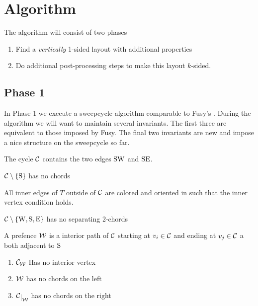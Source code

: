 
\section{Algorithm}
  The algorithm will consist of two phases

  \begin{enumerate}
    \item Find a \emph{vertically} 1-sided layout with additional properties
    \item Do additional post-processing steps to make this layout $k$-sided.
  \end{enumerate}

\subsection{Phase 1}
  In Phase 1 we execute a sweepcycle algorithm comparable to Fusy's \cite{Fusy2006}.
  During the algorithm we will want to maintain several invariants. The first three are equivalent to those imposed by Fusy. The final two invariants are new and impose a nice structure on the sweepcycle so far.

  \begin{invariants}
    \itemsep=-4pt

    \item \label{i:uni:SWandSE} The cycle $\mathcal{C}$ contains the two edges $\mathrm{S} \mathrm{W}$ and $\mathrm{S} \mathrm{E}$.
    \item \label{i:uni:noChords} $\mathcal{C} \setminus \left\lbrace {\mathrm{S}} \right\rbrace$ has no chords
    \item \label{i:uni:intVertCond} All inner edges of $T$ outside of $\mathcal{C}$ are colored and oriented in such that the inner vertex condition holds. %
    \item \label{i:uni:no2Chords} $\mathcal{C}\setminus \left\lbrace {\mathrm{W}, \mathrm{S}, \mathrm{E}} \right\rbrace$ has no separating 2-chords
  \end{invariants}


  \begin{defi}[Prefence]
  A prefence $\mathcal{W}$ is a interior path of $\mathcal{C}$ starting at $v_i \in \mathcal{C}$ and ending at $v_j \in \mathcal{C}$ a both adjacent to $\mathrm{S}$
  \begin{enumerate}
    \itemsep=-4pt
    \renewcommand*{\labelenumi}{(P\arabic{enumi})}%
    \renewcommand*{\theenumi}{(P\arabic{enumi})}%

    \item  $\mathcal{C}_{\mathcal{W}}$ Has no interior vertex
    \label{p:noInteriorVertex}
    \item  $\mathcal{W}$ has no chords on the left     \label{p:Wchordfree}
    \item  $\restC{\W}$ has no chords on the right     \label{p:Cchordfree}
  \end{enumerate}
  \end{defi}

